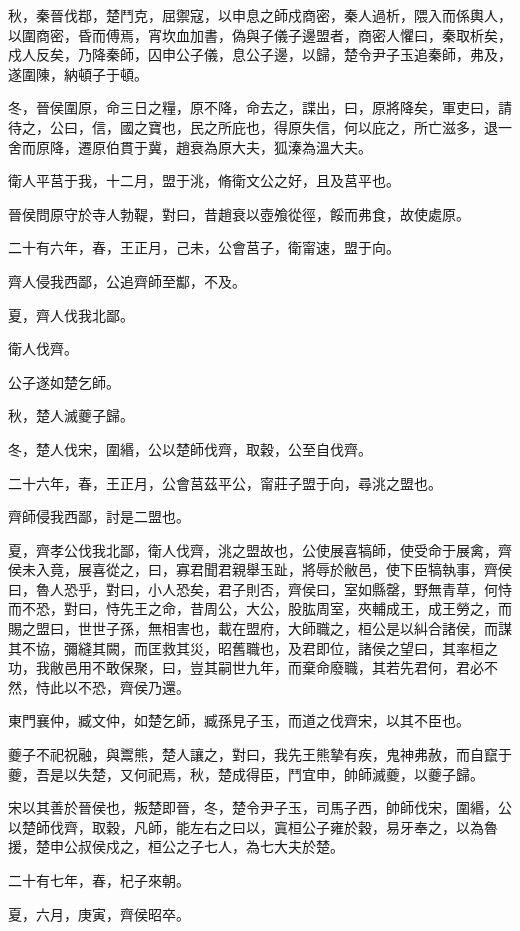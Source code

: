 \begin{pinyinscope}
秋，秦晉伐鄀，楚鬥克，屈禦寇，以申息之師戍商密，秦人過析，隈入而係輿人，以圍商密，昏而傅焉，宵坎血加書，偽與子儀子邊盟者，商密人懼曰，秦取析矣，戍人反矣，乃降秦師，囚申公子儀，息公子邊，以歸，楚令尹子玉追秦師，弗及，遂圍陳，納頓子于頓。

冬，晉侯圍原，命三日之糧，原不降，命去之，諜出，曰，原將降矣，軍吏曰，請待之，公曰，信，國之寶也，民之所庇也，得原失信，何以庇之，所亡滋多，退一舍而原降，遷原伯貫于冀，趙衰為原大夫，狐溱為溫大夫。

衛人平莒于我，十二月，盟于洮，脩衛文公之好，且及莒平也。

晉侯問原守於寺人勃鞮，對曰，昔趙衰以壺飧從徑，餒而弗食，故使處原。

二十有六年，春，王正月，己未，公會莒子，衛甯速，盟于向。

齊人侵我西鄙，公追齊師至酅，不及。

夏，齊人伐我北鄙。

衛人伐齊。

公子遂如楚乞師。

秋，楚人滅夔子歸。

冬，楚人伐宋，圍緡，公以楚師伐齊，取穀，公至自伐齊。

二十六年，春，王正月，公會莒茲平公，甯莊子盟于向，尋洮之盟也。

齊師侵我西鄙，討是二盟也。

夏，齊孝公伐我北鄙，衛人伐齊，洮之盟故也，公使展喜犒師，使受命于展禽，齊侯未入竟，展喜從之，曰，寡君聞君親舉玉趾，將辱於敝邑，使下臣犒執事，齊侯曰，魯人恐乎，對曰，小人恐矣，君子則否，齊侯曰，室如縣罄，野無青草，何恃而不恐，對曰，恃先王之命，昔周公，大公，股肱周室，夾輔成王，成王勞之，而賜之盟曰，世世子孫，無相害也，載在盟府，大師職之，桓公是以糾合諸侯，而謀其不協，彌縫其闕，而匡救其災，昭舊職也，及君即位，諸侯之望曰，其率桓之功，我敝邑用不敢保聚，曰，豈其嗣世九年，而棄命廢職，其若先君何，君必不然，恃此以不恐，齊侯乃還。

東門襄仲，臧文仲，如楚乞師，臧孫見子玉，而道之伐齊宋，以其不臣也。

夔子不祀祝融，與鬻熊，楚人讓之，對曰，我先王熊摯有疾，鬼神弗赦，而自竄于夔，吾是以失楚，又何祀焉，秋，楚成得臣，鬥宜申，帥師滅夔，以夔子歸。

宋以其善於晉侯也，叛楚即晉，冬，楚令尹子玉，司馬子西，帥師伐宋，圍緡，公以楚師伐齊，取穀，凡師，能左右之曰以，寘桓公子雍於穀，易牙奉之，以為魯援，楚申公叔侯戍之，桓公之子七人，為七大夫於楚。

二十有七年，春，杞子來朝。

夏，六月，庚寅，齊侯昭卒。


\end{pinyinscope}
